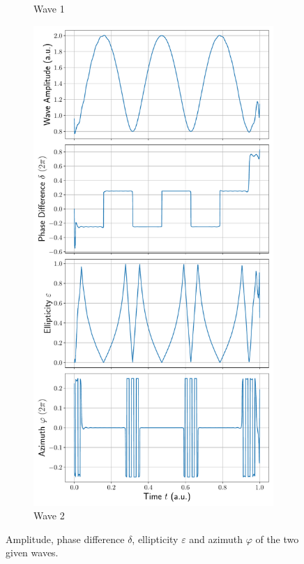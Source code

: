 \documentclass[a4paper,DIV=12,english]{scrartcl}
\begin{document}
\begin{figure}
\begin{subfigure}{0.49\textwidth}
        \caption{Wave 1}
        \label{subfig:wave1}
    \end{subfigure}    
    \begin{subfigure}{0.49\textwidth}
        \centering
        \includegraphics[width=\textwidth]{../wave2.pdf}
        \caption{Wave 2}
        \label{subfig:wave2}
    \end{subfigure}    
    \caption{Amplitude, phase difference $\delta$, ellipticity $\varepsilon$ and azimuth $\varphi$ of the two given waves.}
    \label{fig:waves}
\end{figure}
\end{document}
